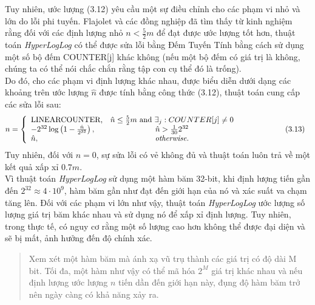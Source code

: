 \documentclass[letterpaper,13pt]{article}
\theoremstyle{mytheor}
\begin{document}
\indent Tuy nhiên, ước lượng (3.12) yêu cầu một sự điều chỉnh cho các phạm vi nhỏ và lớn do lỗi phi tuyến. Flajolet và các đồng nghiệp 
đã tìm thấy từ kinh nghiệm rằng đối với các định lượng nhỏ $n < \frac{5}{2}m$ để đạt được ước lượng tốt hơn, thuật toán \textit{HyperLogLog} 
có thể được sửa lỗi bằng Đếm Tuyến Tính bằng cách sử dụng một số bộ đếm COUNTER[j] khác không (nếu một bộ đếm có giá trị là không, 
chúng ta có thể nói chắc chắn rằng tập con cụ thể đó là trống).\\
Do đó, cho các phạm vi định lượng khác nhau, được biểu diễn dưới dạng các khoảng trên ước lượng $\hat{n}$ được tính bằng công thức (3.12), 
thuật toán cung cấp các sửa lỗi sau:
\[
    n = \left\{ \begin{array}{lcl}
        \text{LINEARCOUNTER,} & \hat{n} \leq \frac{5}{2}m \mbox{ and } \exists_j : COUNTER[j] \neq 0 \\ 
        -2^{32}\log\left(1-\frac{\hat{n}}{2^{32}}\right), & \hat{n}>\frac{1}{30}2^{32} & \mbox{\hspace{2cm}(3.13)} \\
        \hat{n}, & \textit{otherwise.}
        \end{array}\right.    
\]
\indent Tuy nhiên, đối với $n = 0$, sự sửa lỗi có vẻ không đủ và thuật toán luôn trả về một kết quả xấp xỉ $0.7m$.\\
Vì thuật toán \textit{HyperLogLog} sử dụng một hàm băm 32-bit, khi định lượng tiến gần đến $2^{32}\approx 4 \cdot 10^9$, 
hàm băm gần như đạt đến giới hạn của nó và xác suất va chạm tăng lên. Đối với các phạm vi lớn như vậy, thuật toán \textit{HyperLogLog} 
ước lượng số lượng giá trị băm khác nhau và sử dụng nó để xấp xỉ định lượng. Tuy nhiên, trong thực tế, có nguy cơ rằng một số lượng cao hơn 
không thể được đại diện và sẽ bị mất, ảnh hưởng đến độ chính xác.\\
\vspace{0.25cm}
\begin{quote}
    Xem xét một hàm băm mà ánh xạ vũ trụ thành các giá trị có độ dài M bit. Tối đa, một hàm như vậy có thể mã hóa $2^M$ 
    giá trị khác nhau và nếu định lượng ước lượng $n$ tiến dần đến giới hạn này, đụng độ hàm băm trở nên ngày càng có khả năng xảy ra.
    \vspace{0.25cm}
\end{quote}
\end{document}
